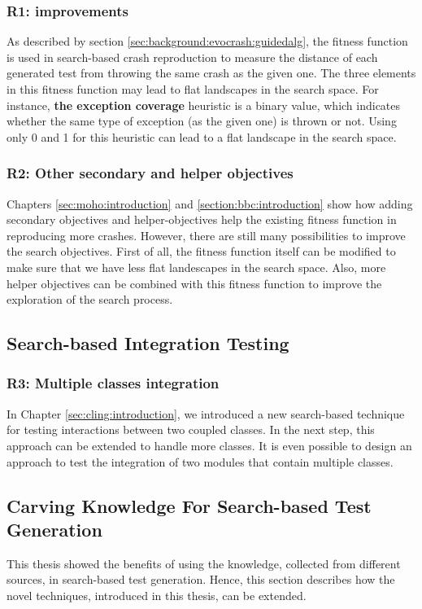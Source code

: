 \subsubsection{R1: \CrashFunction improvements}
As described by section \ref{sec:background:evocrash:guidedalg}, the \CrashFunction fitness function is used in search-based crash reproduction to measure the distance of each generated test from throwing the same crash as the given one. The three elements in this fitness function may lead to flat landscapes in the search space. For instance, \textbf{the exception coverage} heuristic is a binary value, which indicates whether the same type of exception (as the given one) is thrown or not. Using only 0 and 1 for this heuristic can lead to a flat landscape in the search space.


\subsubsection{R2: Other secondary and helper objectives}
 Chapters \ref{sec:moho:introduction} and \ref{section:bbc:introduction} show how adding secondary objectives and helper-objectives help the existing \CrashFunction fitness function in reproducing more crashes. However, there are still many possibilities to improve the search objectives. First of all, the \CrashFunction fitness function itself can be modified to make sure that we have less flat landescapes in the search space. Also, more helper objectives can be combined with this fitness function to improve the exploration of the search process.



\subsection{Search-based Integration Testing}
\subsubsection{R3: Multiple classes integration}
In Chapter \ref{sec:cling:introduction}, we introduced a new search-based technique for testing interactions between two coupled classes. In the next step, this approach can be extended to handle more classes. It is even possible to design an approach to test the integration of two modules that contain multiple classes.

\subsection{Carving Knowledge For Search-based Test Generation}
This thesis showed the benefits of using the knowledge, collected from different sources, in search-based test generation. Hence, this section describes how the novel techniques, introduced in this thesis, can be extended.

